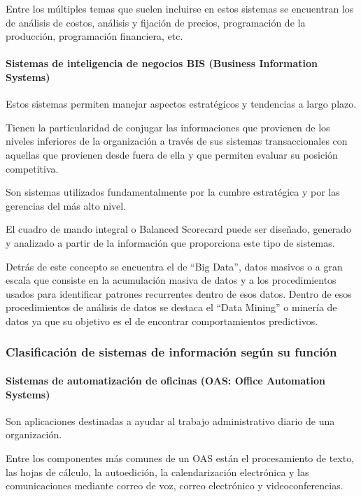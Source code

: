 \documentclass[a4paper, 12pt]{article}
\begin{document}
Entre los múltiples temas que suelen incluirse en estos sistemas se encuentran los de análisis de costos, análisis y fijación de precios, programación de la producción, programación financiera, etc.

\paragraph{Sistemas de inteligencia de negocios BIS (Business Information Systems)}

Estos sistemas permiten manejar aspectos estratégicos y tendencias a largo plazo. 

Tienen la particularidad de conjugar las informaciones que provienen de los niveles inferiores de la organización a través de sus sistemas transaccionales con aquellas que provienen desde fuera de ella y que permiten evaluar su posición competitiva. 

Son sistemas utilizados fundamentalmente por la cumbre estratégica y por las gerencias del más alto nivel.

El cuadro de mando integral o Balanced Scorecard puede ser diseñado, generado y analizado a partir de la información que proporciona este tipo de sistemas.

Detrás de este concepto se encuentra el de “Big Data”, datos masivos o a gran escala que consiste en la acumulación masiva de datos y a los procedimientos usados para identificar patrones recurrentes dentro de esos datos. Dentro de esos procedimientos de análisis de datos se destaca el “Data Mining” o minería de datos ya que su objetivo es el de encontrar comportamientos predictivos.

\subsubsection{Clasificación de sistemas de información según su función}
\label{ClasificacionFuncion}

\paragraph{Sistemas de automatización de oficinas (OAS: Office Automation Systems)}

Son aplicaciones destinadas a ayudar al trabajo administrativo diario de una organización. 

Entre los componentes más comunes de un OAS están el procesamiento de texto, las hojas de cálculo, la autoedición, la calendarización electrónica y las comunicaciones mediante correo de voz, correo electrónico y videoconferencias.
\end{document}
